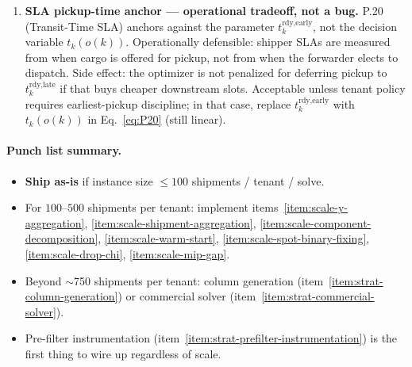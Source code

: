 \documentclass[11pt,a4paper]{article}
\theoremstyle{definition}
\begin{document}
\begin{enumerate}[resume]
  \item \label{item:strat-sla-pickup-anchor} \textbf{SLA pickup-time anchor --- operational tradeoff, not a bug.}
        P.20 (Transit-Time SLA) anchors against the parameter $t_k^{\text{rdy,early}}$,
        not the decision variable $t_k(o(k))$. Operationally defensible: shipper
        SLAs are measured from when cargo is offered for pickup, not from when the
        forwarder elects to dispatch. Side effect: the optimizer is not penalized for
        deferring pickup to $t_k^{\text{rdy,late}}$ if that buys cheaper downstream
        slots. Acceptable unless tenant policy requires earliest-pickup discipline; in
        that case, replace $t_k^{\text{rdy,early}}$ with $t_k(o(k))$ in
        Eq.~\ref{eq:P20} (still linear).
\end{enumerate}

\paragraph{Punch list summary.}
\begin{itemize}[noitemsep]
  \item \textbf{Ship as-is} if instance size $\leq 100$ shipments / tenant / solve.
  \item For $100$--$500$ shipments per tenant: implement items~\ref{item:scale-y-aggregation},
        \ref{item:scale-shipment-aggregation}, \ref{item:scale-component-decomposition},
        \ref{item:scale-warm-start}, \ref{item:scale-spot-binary-fixing},
        \ref{item:scale-drop-chi}, \ref{item:scale-mip-gap}.
  \item Beyond $\sim$750 shipments per tenant: column generation
        (item~\ref{item:strat-column-generation}) or commercial solver
        (item~\ref{item:strat-commercial-solver}).
  \item Pre-filter instrumentation (item~\ref{item:strat-prefilter-instrumentation}) is
        the first thing to wire up regardless of scale.
\end{itemize}
\end{document}

